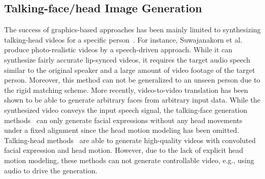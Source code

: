 \documentclass[runningheads]{llncs}
\begin{document}
\subsection{Talking-face/head Image Generation}
\label{subsec:talking-syn}
The success of graphics-based approaches has been mainly limited to synthesizing talking-head videos for a specific person~\cite{garrido2015vdub,bregler1997video,chang2005transferable,liu2011realistic,suwajanakorn2017synthesizing}. For instance, Suwajanakorn et al.~\cite{suwajanakorn2017synthesizing} produce photo-realistic videos by a speech-driven approach. While it can synthesize fairly accurate lip-synced videos, it requires the target audio speech similar to the original speaker and a large amount of video footage of the target person. Moreover, this method can not be generalized to an unseen person due to the rigid matching scheme. More recently, video-to-video translation has been shown to be able to generate arbitrary faces from arbitrary input data. While the synthesized video conveys the input speech signal, the talking-face generation methods~\cite{chung2017you,zhou2019talking,ijcai2019-129,Vougioukas2019,chen2019hierarchical} can only generate facial expressions without any head movements under a fixed alignment since the head motion modeling has been omitted. Talking-head methods~\cite{zakharov2019few,chen2019hierarchical,wiles2018x2face} are able to generate high-quality videos with convoluted facial expression and head motion. However, due to the lack of explicit head motion modeling, these methods can not generate controllable video, e.g., using audio to drive the generation. 
\end{document}

